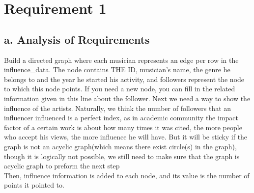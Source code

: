 \documentclass{article}
\begin{document}
\section{Requirement 1}
\subsection{a. Analysis of Requirements}
Build a directed graph where each musician represents an edge per row in the influence\_data. The node contains THE ID, musician's name, the genre he belongs to and the year
he started his activity, and followers represent the node to which this node points.
If you need a new node, you can fill in the related information given in this line about the follower.
Next we need a way to show the influence of the artists. Naturally, we think the number of followers that an influencer influenced is a perfect index, as in academic community
the impact factor of a certain work is about how many times it was cited, the more people who accept his views, the more influence he will have. But it will be sticky
if the graph is not an acyclic graph(which means there exist circle(s) in the graph), though it is  logically not possible, we still need to make sure that
the graph is acyclic graph to preform the next step\\
Then, influence information is added to each node, and its value is the number of points it pointed to.
\end{document}

